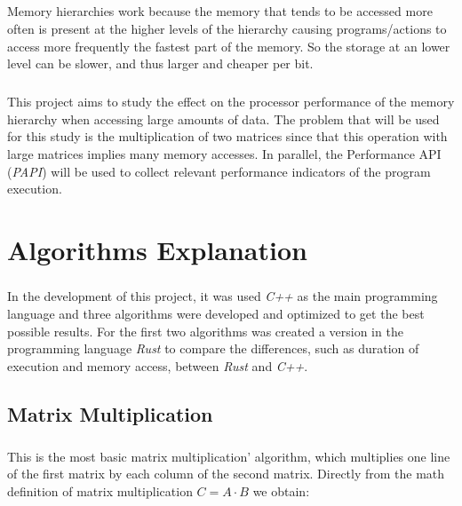 \documentclass{report}
\begin{document}
			\paragraph{} Memory hierarchies work because the memory that tends to be accessed more often is present at the higher levels of the hierarchy causing programs/actions to access more frequently the fastest part of the memory. So the storage at an lower level can be slower, and thus larger and cheaper per bit.
			
			\paragraph{} This project aims to study the effect on the processor performance of the memory hierarchy when accessing large amounts of data. The problem that will be used for this study is the multiplication of two matrices since that this operation with large matrices implies many memory accesses. In parallel, the Performance API (\emph{PAPI}) will be used to collect relevant performance indicators of the program execution.
			
			
	\chapter{Algorithms Explanation}
	
		\paragraph{} In the development of this project, it was used \emph{C++} as the main programming language and three algorithms were developed and optimized to get the best possible results. For the first two algorithms was created a version in the programming language \emph{Rust} to compare the differences, such as duration of execution and memory access, between \emph{Rust} and \emph{C++}.
		
		\section{Matrix Multiplication}
		
			\paragraph{} This is the most basic matrix multiplication' algorithm, which multiplies one line of the first matrix by each column of the second matrix. Directly from the math definition of matrix multiplication $C = A \cdot B$ we obtain:
			
\end{document}
